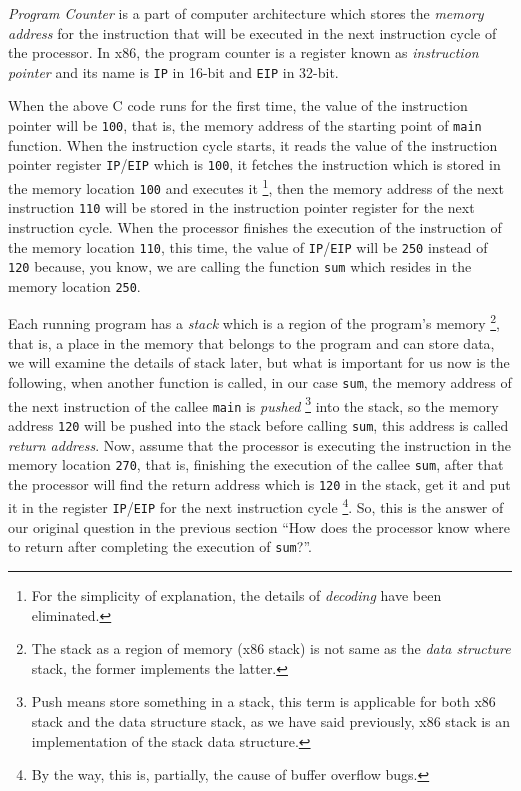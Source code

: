 \emph{Program Counter} is a part of computer architecture which stores
the \emph{memory address} for the instruction that will be executed in
the next instruction cycle of the processor. In x86, the program counter
is a register known as \emph{instruction pointer} and its name is
\lstinline!IP! in 16-bit and \lstinline!EIP! in 32-bit.

When the above C code runs for the first time, the value of the
instruction pointer will be \lstinline!100!, that is, the memory address
of the starting point of \lstinline!main! function. When the instruction
cycle starts, it reads the value of the instruction pointer register
\lstinline!IP!/\lstinline!EIP! which is \lstinline!100!, it fetches the
instruction which is stored in the memory location \lstinline!100! and
executes it \footnote{For the simplicity of explanation, the details of
  \emph{decoding} have been eliminated.}, then the memory address of the
next instruction \lstinline!110! will be stored in the instruction
pointer register for the next instruction cycle. When the processor
finishes the execution of the instruction of the memory location
\lstinline!110!, this time, the value of \lstinline!IP!/\lstinline!EIP!
will be \lstinline!250! instead of \lstinline!120! because, you know, we
are calling the function \lstinline!sum! which resides in the memory
location \lstinline!250!.

Each running program has a \emph{stack} which is a region of the
program's memory \footnote{The stack as a region of memory (x86 stack)
  is not same as the \emph{data structure} stack, the former implements
  the latter.}, that is, a place in the memory that belongs to the
program and can store data, we will examine the details of stack later,
but what is important for us now is the following, when another function
is called, in our case \lstinline!sum!, the memory address of the next
instruction of the callee \lstinline!main! is \emph{pushed} \footnote{Push
  means store something in a stack, this term is applicable for both x86
  stack and the data structure stack, as we have said previously, x86
  stack is an implementation of the stack data structure.} into the
stack, so the memory address \lstinline!120! will be pushed into the
stack before calling \lstinline!sum!, this address is called
\emph{return address}. Now, assume that the processor is executing the
instruction in the memory location \lstinline!270!, that is, finishing
the execution of the callee \lstinline!sum!, after that the processor
will find the return address which is \lstinline!120! in the stack, get
it and put it in the register \lstinline!IP!/\lstinline!EIP! for the
next instruction cycle \footnote{By the way, this is, partially, the
  cause of buffer overflow bugs.}. So, this is the answer of our
original question in the previous section ``How does the processor know
where to return after completing the execution of \lstinline!sum!?''.

